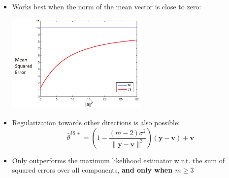 \documentclass[]{beamer}
\renewcommand{\vec}[1]{\boldsymbol{#1}}
\newcommand{\by}{\boldsymbol{y}}
\renewcommand{\alert}[1]{\textbf{\color{putblue} #1}}
\begin{document}
\begin{frame}


\begin{itemize}

\item Works best when the norm of the mean vector is close to zero:\\
\begin{center}
\includegraphics[width=7cm]{Figures/JS}
\end{center} \pause 
\item Regularization towards other directions is also possible:
$$
\hat{\theta}^{\mathrm{JS+}} = \left (1 - \frac{(m-2)\sigma^2}{\|\by - \vec{v}\|^2} \right )(\by - \vec{v}) + \vec{v}
$$
\item Only outperforms the maximum likelihood estimator w.r.t. the sum of squared errors over all components, \alert{and only when $m \geq 3$}

\end{itemize}
\end{frame}
\end{document}

